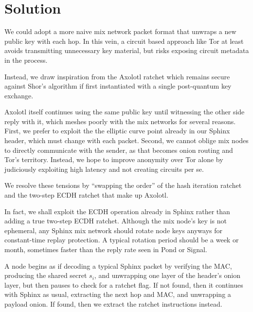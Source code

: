 \documentclass[twoside,letterpaper]{sig-alternate}
\begin{document}
\section{Solution}

We could adopt a more naive mix network packet format that unwraps
a new public key with each hop.  In this vein, a circuit based approach
like Tor at least avoids transmitting unnecessary key material, but
risks exposing circuit metadata in the process. 

Instead, we draw inspiration from the Axolotl ratchet %
which remains secure against Shor's algorithm if
 first instantiated with a single post-quantum key exchange. 

Axolotl itself continues using the same public key until witnessing
 the other side reply with it, which meshes poorly with the mix networks
for several reasons.
%
First, we prefer to exploit the the elliptic curve point
 already in our Sphinx header, which must change with each packet.
%
Second, we cannot oblige mix nodes to directly communicate with
 the sender, as that becomes onion routing and Tor's territory.
%
Instead, we hope to improve anonymity over Tor alone by
 judiciously exploiting high latency and not creating circuits per se.

We resolve these tensions by ``swapping the order'' of the hash iteration
ratchet and the two-step ECDH ratchet that make up Axolotl.  

In fact, we shall exploit the ECDH operation already in Sphinx rather
 than adding a true two-step ECDH ratchet.
Although the mix node's key is not ephemeral, any Sphinx mix network
should rotate node keys anyways for constant-time replay protection.
A typical rotation period should be a week or month, sometimes
 faster than the reply rate seen in Pond or Signal.

\smallskip


\def\cn{\texttt{cn}}
\def\ck{\texttt{ck}}
\def\DH{\texttt{DH}}
\def\lk{\texttt{lk}}
\def\mk{\texttt{mk}}
\def\sk{\texttt{sk}}
\def\ECDH{\textrm{ECDH}}

A node begins as if decoding a typical Sphinx packet by
 verifying the MAC,
 producing the shared secret $s_i$, and 
 unwrapping one layer of the header's onion layer,
but then pauses to check for a ratchet flag. 
If not found, then it continues with Sphinx as usual, 
 extracting the next hop and MAC, and unwrapping a payload onion.
If found, then we extract the ratchet instructions instead.
\end{document}

